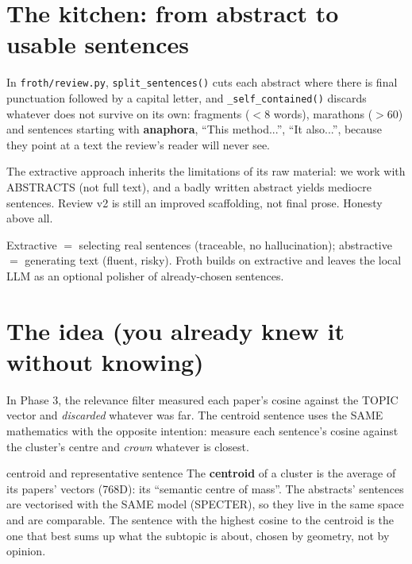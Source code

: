 \documentclass[11pt,a4paper]{article}
\begin{document}
\section{The kitchen: from abstract to usable sentences}

In \texttt{froth/review.py}, \texttt{split\_sentences()} cuts each abstract where there is
final punctuation followed by a capital letter, and \texttt{\_self\_contained()} discards
whatever does not survive on its own: fragments ($<$8 words), marathons ($>$60) and sentences
starting with \textbf{anaphora}, ``This method...'', ``It also...'', because they point at a
text the review's reader will never see.

\begin{ojo}
The extractive approach inherits the limitations of its raw material: we work with ABSTRACTS
(not full text), and a badly written abstract yields mediocre sentences. Review v2 is still an
improved scaffolding, not final prose. Honesty above all.
\end{ojo}

\begin{resumen}
Extractive $=$ selecting real sentences (traceable, no hallucination); abstractive $=$
generating text (fluent, risky). Froth builds on extractive and leaves the local LLM as an
optional polisher of already-chosen sentences.
\end{resumen}
\clearpage
{}
{}

\section{The idea (you already knew it without knowing)}

In Phase 3, the relevance filter measured each paper's cosine against the TOPIC vector and
\emph{discarded} whatever was far. The centroid sentence uses the SAME mathematics with the
opposite intention: measure each sentence's cosine against the cluster's centre and
\emph{crown} whatever is closest.

\begin{concepto}{centroid and representative sentence}
The \textbf{centroid} of a cluster is the average of its papers' vectors (768D): its ``semantic
centre of mass''. The abstracts' sentences are vectorised with the SAME model (SPECTER), so
they live in the same space and are comparable. The sentence with the highest cosine to the
centroid is the one that best sums up what the subtopic is about, chosen by geometry, not by
opinion.
\end{concepto}
\end{document}
